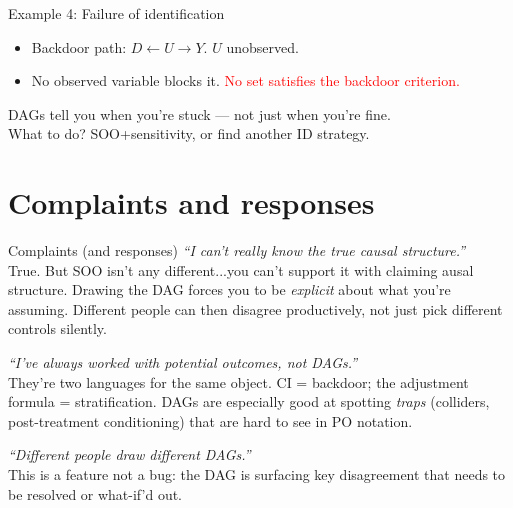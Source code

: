 \documentclass[xcolor=dvipsnames]{beamer}
\newcommand{\la}{\leftarrow}
\begin{document}
\begin{frame}{Example 4: Failure of identification}
\begin{center}
\end{center}
\small
\begin{itemize}
\item<2-> Backdoor path: $D \la U \to Y$.  $U$ unobserved.
\item<3-> No observed variable blocks it.  \textcolor{Red}{No set satisfies the backdoor criterion.}
\end{itemize}

\bigskip
{} DAGs tell you when you're stuck --- not just when you're fine. \\
\bigskip
{}  What to do? SOO+sensitivity, or find another ID strategy.
\end{frame}


\section{Complaints and responses}

\begin{frame}{Complaints (and responses)}
\small
{} \textit{``I can't really know the true causal structure.''}\\
\smallskip
{} True.  But SOO isn't any different...you can't support it with claiming ausal structure. Drawing the DAG forces you to be \textit{explicit} about what you're assuming.  Different people can then disagree productively, not just pick different controls silently.

\bigskip
{} \textit{``I've always worked with potential outcomes, not DAGs.''}\\
\smallskip
{} They're two languages for the same object.  CI = backdoor; the adjustment formula = stratification.  DAGs are especially good at spotting \textit{traps} (colliders, post-treatment conditioning) that are hard to see in PO notation.

\bigskip
{} \textit{``Different people draw different DAGs.''}\\
\smallskip
{} This is a feature not a bug: the DAG is surfacing key disagreement that needs to be resolved or what-if'd out.
\end{frame}
\end{document}

